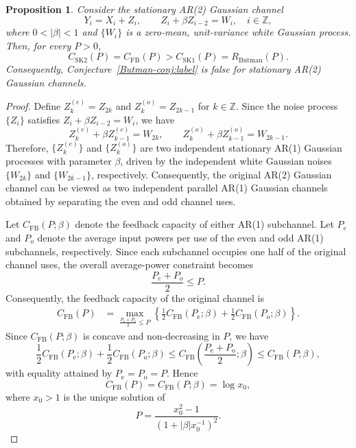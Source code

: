 \documentclass[12pt]{article}
\newtheorem{pr}[thm]{Proposition}
\begin{document}
\begin{pr}
\label{prop:interleaved-AR1}
Consider the stationary AR(2) Gaussian channel
$$
Y_i=X_i+Z_i,\qquad Z_i+\beta Z_{i-2}=W_i,\quad i\in\mathbb Z,
$$
where \(0<|\beta|<1\) and \(\{W_i\}\) is a zero-mean, unit-variance white Gaussian process. Then, for every $P>0$,
$$
C_{\mathrm{SK2}}(P) = C_{\mathrm{FB}}(P) > C_{\mathrm{SK1}}(P) = R_{\mathrm{Butman}}(P).
$$
Consequently, Conjecture~\ref{Butman-conj:label} is false for stationary AR(2) Gaussian channels.
\end{pr}

\begin{proof}
Define $Z_k^{(e)}=Z_{2k}$ and $Z^{(o)}_k=Z_{2k-1}$ for $k\in\mathbb{Z}$. Since the noise process $\{Z_i\}$ satisfies $Z_i+\beta Z_{i-2}=W_i$, we have
$$
Z^{(e)}_{k}+\beta Z_{k-1}^{(e)}=W_{2k}, \qquad Z^{(o)}_{k}+\beta Z^{(o)}_{k-1}=W_{2k-1}.
$$
Therefore, $\{Z^{(e)}_k\}$ and $\{Z^{(o)}_k\}$ are two independent stationary AR(1) Gaussian processes with parameter $\beta$, driven by the independent white Gaussian noises $\{W_{2k}\}$ and $\{W_{2k-1}\}$, respectively. Consequently, the original AR(2) Gaussian channel can be viewed as two independent parallel AR(1) Gaussian channels obtained by separating the even and odd channel uses.

Let $C_{\mathrm{FB}}(P;\beta)$ denote the feedback capacity of either AR(1) subchannel. Let $P_e$ and $P_o$ denote the average input powers per use of the even and odd AR(1) subchannels, respectively. Since each subchannel occupies one half of the original channel uses, the overall average-power constraint becomes
$$
\frac{P_e+P_o}{2}\le P.
$$
Consequently, the feedback capacity of the original channel is
\begin{equation*}\label{CFB-interleave-ar2}
\begin{aligned}
C_{\mathrm{FB}}(P)
&= \max_{\frac{P_{\mathrm e}+P_{\mathrm o}}{2}\le P}
\left\{
\frac12 C_{\mathrm{FB}}(P_{\mathrm e};\beta) + \frac12 C_{\mathrm{FB}}(P_{\mathrm o};\beta) \right\}.
\end{aligned}
\end{equation*}
Since $C_\mathrm{FB}(P;\beta)$ is concave and non-decreasing in $P$, we have
$$
\frac12 C_\mathrm{FB}(P_{\mathrm e};\beta) + \frac12 C_{\mathrm{FB}}(P_{\mathrm o};\beta)
\le
C_{\mathrm{FB}}\left(\frac{P_{\mathrm e}+P_{\mathrm o}}{2};\beta\right)
\le
C_{\mathrm{FB}}(P;\beta),
$$
with equality attained by $P_{\mathrm e}=P_{\mathrm o}=P$. Hence
\begin{equation}\label{CFB-interleave-ar2-2}
C_{\mathrm{FB}}(P)= C_{\mathrm{FB}}(P;\beta)=\log x_0,
\end{equation}
where $x_0>1$ is the unique solution of
\begin{equation}\label{eq:interleaved-capacity}
P= \frac{x_0^2-1} {\left(1+|\beta|x_0^{-1}\right)^2}.
\end{equation}


\end{proof}
\end{document}
